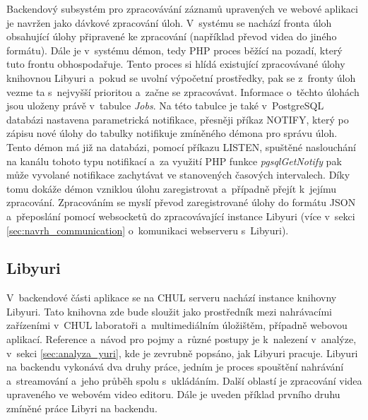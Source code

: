 \documentclass[thesis=M,czech]{FITthesis}[2012/06/26]
\begin{document}
Backendový subsystém pro zpracovávání záznamů upravených ve webové aplikaci je navržen jako dávkové zpracování úloh. V~systému se nachází fronta úloh obsahující úlohy připravené ke zpracování (například převod videa do jiného formátu). Dále je v~systému démon, tedy PHP proces běžící na pozadí, který tuto frontu obhospodařuje. Tento proces si hlídá existující zpracovávané úlohy knihovnou Libyuri a~pokud se uvolní výpočetní prostředky, pak se z~fronty úloh vezme ta s~nejvyšší prioritou a~začne se zpracovávat. Informace o~těchto úlohách jsou uloženy právě v~tabulce \textit{Jobs}. Na této tabulce je také v~PostgreSQL databázi nastavena parametrická notifikace, přesněji příkaz NOTIFY, který po zápisu nové úlohy do tabulky notifikuje zmíněného démona pro správu úloh. Tento démon má již na databázi, pomocí příkazu LISTEN, spuštěné naslouchání na kanálu tohoto typu notifikací a~za využití PHP funkce \textit{pgsqlGetNotify} pak může vyvolané notifikace zachytávat ve stanovených časových intervalech. Díky tomu dokáže démon vzniklou úlohu zaregistrovat a~případně přejít k~jejímu zpracování. Zpracováním se myslí převod zaregistrované úlohy do formátu JSON a~přeposlání pomocí websocketů do zpracovávající instance Libyuri (více v~sekci \ref{sec:navrh_communication} o~komunikaci webserveru s~Libyuri).

\subsection{Libyuri} \label{subsec:navrh_backend_libyuri}
V~backendové části aplikace se na CHUL serveru nachází instance knihovny Libyuri. Tato knihovna zde bude sloužit jako prostředník mezi nahrávacími zařízeními v~CHUL laboratoři a~multimediálním úložištěm, případně webovou aplikací. Reference a~návod pro pojmy a~různé postupy je k~nalezení v~analýze, v~sekci \ref{sec:analyza_yuri}, kde je zevrubně popsáno, jak Libyuri pracuje. Libyuri na backendu vykonává dva druhy práce, jedním je proces spouštění nahrávání a~streamování a~jeho průběh spolu s~ukládáním. Další oblastí je zpracování videa upraveného ve webovém video editoru. Dále je uveden příklad prvního druhu zmíněné práce Libyri na backendu.
\end{document}

